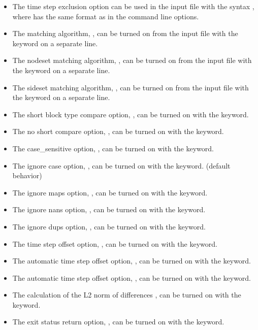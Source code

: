 \begin{itemize}
\item The time step exclusion option can be used in the input file with
           the syntax , where  has the same
           format as in the command line options.

\item  The matching algorithm, , can be turned on from the input file
           with the  keyword on a separate line.

\item  The nodeset matching algorithm, , can be turned on from the
           input file with the  keyword on a separate line.
\item  The sideset matching algorithm, , can be turned on from the
           input file with the  keyword on a separate line.
\item  The short block type compare option, , can be turned on with the
	 keyword.
\item  The no short compare option, , can be turned on with the
            keyword.
\item  The case\_sensitive option, , can be turned on with the
            keyword.
\item  The ignore case option, , can be turned on with the
            keyword. (default behavior)
\item  The ignore maps option, , can be turned on with the
            keyword.
\item  The ignore nans option, , can be turned on with the
            keyword.
\item  The ignore dups option, , can be turned on with the
            keyword.
\item  The time step offset option, , can be turned on with the
            keyword.
\item  The automatic time step offset option, , can be turned
           on with the  keyword.
\item  The automatic time step offset option, , can be turned
           on with the  keyword.
\item  The calculation of the L2 norm of differences , can be turned
           on with the  keyword.
\item  The exit status return option, , can be turned on with the
            keyword.
\end{itemize}
